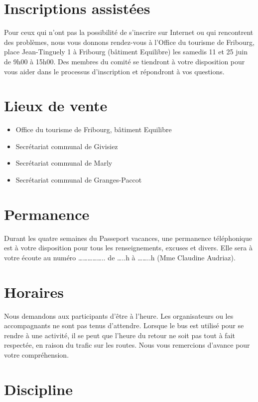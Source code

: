 \section*{Inscriptions assistées}

Pour ceux qui n'ont pas la possibilité de s'inscrire sur Internet ou qui
rencontrent des problèmes, nous vous donnons rendez-vous à l'Office du
tourisme de Fribourg, place Jean-Tinguely 1 à Fribourg (bâtiment Equilibre) les
samedis 11 et 25 juin de 9h00 à 15h00. Des membres du comité se tiendront à
votre disposition pour vous aider dans le processus d'inscription et répondront
à vos questions.

\section*{Lieux de vente}

\begin{itemize}
\item Office du tourisme de Fribourg, bâtiment Equilibre
\item Secrétariat communal de Givisiez
\item Secrétariat communal de Marly
\item Secrétariat communal de Granges-Paccot
\end{itemize}

\section*{Permanence}

Durant les quatre semaines du Passeport vacances, une permanence
téléphonique est à votre disposition pour tous les renseignements, excuses et
divers. Elle sera à votre écoute au numéro …………….. de …..h à ……..h (Mme
Claudine Audriaz).

\section*{Horaires}

Nous demandons aux participants d'être à l'heure. Les organisateurs ou les
accompagnants ne sont pas tenus d'attendre. Lorsque le bus est utilisé pour se
rendre à une activité, il se peut que l'heure du retour ne soit pas tout à fait
respectée, en raison du trafic sur les routes. Nous vous remercions d'avance
pour votre compréhension.

\section*{Discipline}

